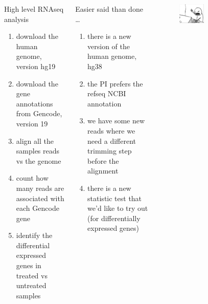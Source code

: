 \documentclass[xcolor=table]{beamer}
\begin{document}
\begin{frame}
\begin{columns}[c]
\begin{beamerboxesrounded}[upper=upper_box2,lower=lower_box,shadow=true]{High level RNAseq analysis}
\begin{enumerate}
\item download the human genome, version hg19
\item download the gene annotations from \textcolor{beer}{Gencode}, version 19
\item align all the samples reads vs the genome
\item count how many reads are associated with each Gencode gene
\item identify the differential expressed genes in treated vs untreated samples
\end{enumerate}
\end{beamerboxesrounded}

\begin{beamerboxesrounded}[upper=upper_box3,lower=lower_box,shadow=true]{Easier said than done \ldots}
\begin{enumerate}
\item there is a new version of the human genome, hg38
\item the PI prefers the \textcolor{beer}{refseq NCBI} annotation
\item we have some new reads where we need a different trimming step before the alignment
\item there is a new statistic test that we'd like to try out (for differentially expressed genes)
\end{enumerate}
\end{beamerboxesrounded}
\begin{figure}\includegraphics[width=0.4\textwidth]{./img/desperate.png}\end{figure}
\end{columns}
\end{frame}
\end{document}
